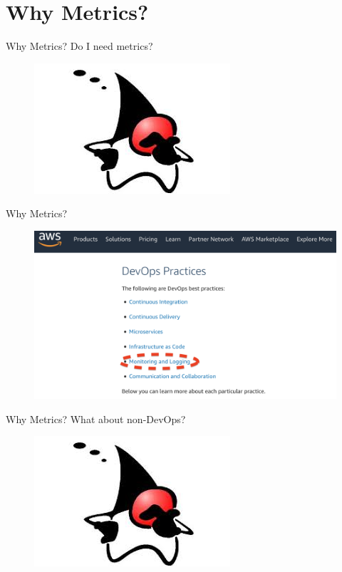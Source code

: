 \documentclass{beamer}
\begin{document}
\section{Why Metrics?}
\begin{frame}{Why Metrics?}
\Large Do I need metrics?
\begin{figure}
	\centering
	\includegraphics[width=0.6\linewidth]{Images/dukewhy}
\end{figure}
\end{frame}


\begin{frame}{Why Metrics?}

\begin{figure}
	\centering
	\includegraphics[width=\linewidth]{Images/amazondevops}
\end{figure}
\end{frame}

\begin{frame}{Why Metrics?}
\Large What about non-DevOps?
\begin{figure}
	\centering
	\includegraphics[width=0.6\linewidth]{Images/dukewhy}
\end{figure}
\end{frame}
\end{document}
